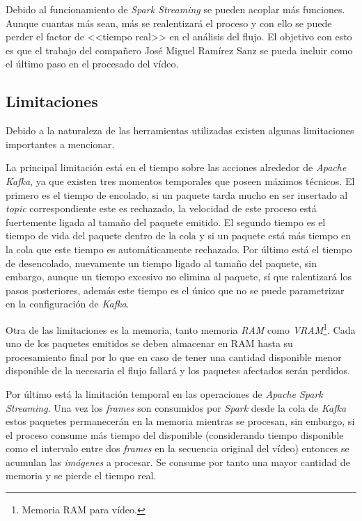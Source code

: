 Debido al funcionamiento de \textit{Spark Streaming} se pueden acoplar más funciones. Aunque cuantas más sean, más se realentizará el proceso y con ello se puede perder el factor de <<tiempo real>> en el análisis del flujo. El objetivo con esto es que el trabajo del compañero José Miguel Ramírez Sanz se pueda incluir como el último paso en el procesado del vídeo.

\subsection{Limitaciones}

Debido a la naturaleza de las herramientas utilizadas existen algunas limitaciones importantes a mencionar.

La principal limitación está en el tiempo sobre las acciones alrededor de \textit{Apache Kafka}, ya que existen tres momentos temporales que poseen máximos técnicos. El primero es el tiempo de encolado, si un paquete tarda mucho en ser insertado al \textit{topic} correspondiente este es rechazado, la velocidad de este proceso está fuertemente ligada al tamaño del paquete emitido. El segundo tiempo es el tiempo de vida del paquete dentro de la cola y si un paquete está más tiempo en la cola que este tiempo es automáticamente rechazado. Por último está el tiempo de desencolado, nuevamente un tiempo ligado al tamaño del paquete, sin embargo, aunque un tiempo excesivo no elimina al paquete, sí que ralentizará los pasos posteriores, además este tiempo es el único que no se puede parametrizar en la configuración de \textit{Kafka}.

Otra de las limitaciones es la memoria, tanto memoria \textit{RAM} como \textit{VRAM}\footnote{Memoria RAM para vídeo.}. Cada uno de los paquetes emitidos se deben almacenar en RAM hasta su procesamiento final por lo que en caso de tener una cantidad disponible menor disponible de la necesaria el flujo fallará y los paquetes afectados serán perdidos.

Por último está la limitación temporal en las operaciones de \textit{Apache Spark Streaming}. Una vez los \textit{frames} son consumidos por \textit{Spark} desde la cola de \textit{Kafka} estos paquetes permanecerán en la memoria mientras se procesan, sin embargo, si el proceso consume más tiempo del disponible (considerando tiempo disponible como el intervalo entre dos \textit{frames} en la secuencia original del vídeo) entonces se acumulan las \textit{imágenes} a procesar. Se consume por tanto una mayor cantidad de memoria y se pierde el tiempo real.

